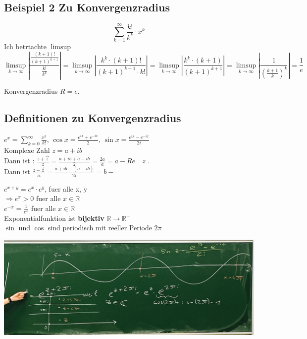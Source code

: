 \documentclass{article}
\theoremstyle{mytheoremstyle}
\theoremstyle{mytheoremstyle}
\theoremstyle{myproblemstyle}
\begin{document}
    \subsection{Beispiel 2 Zu Konvergenzradius}

    \[\sum_{k=1}^{\infty } \frac{k!}{k^k} \cdot x ^ {k}
    \]
    Ich betrtachte $\limsup $ 
    \[
        \limsup_{k \to \infty} \left| \frac{\frac{(k+1)!}{(k+1)^{k+1}}}{\frac{k!}{k^k}} \right|
        = \limsup_{k \to \infty} \left| \frac{k^k \cdot (k+1)!}{(k+1)^{k+1} \cdot k!} \right|
        = \limsup_{k \to \infty} \left| \frac{k^k \cdot (k+1)}{(k+1)^{k+1}} \right|
        = \limsup_{k \to \infty} \left| \frac{1}{\left(\frac{k+1}{k}\right)^k} \right|
        = \frac{1}{e}
    \]
    
    Konvergenzradius $R = e$. 

    \bigskip

    \subsection{Definitionen zu Konvergenzradius}

    $e^x = \sum_{k=0}^{\infty } \frac{x ^ {k}}{k!}$, $\cos x = \frac{e ^ {ix} + e ^ {-ix}}{2}$, $\sin x = \frac{e ^ {ix} - e ^ {-ix}}{2i}$  \\
    Komplexe Zahl $z = a + ib$ \\ 
    Dann ist : $ \frac{z + \vec{z}}{z} = \frac{a+ ib + a - ib }{2} = \frac{2a }{a} = a - Re \quad z$ . \\ 
    Dann ist $\frac{z - \vec{z }}{zi } = \frac{a + ib - (a - ib ) }{2i} = b - $ 

    \bigskip

    \begin{multicols}{2}
        $e ^ {x + y } = e ^ {x} \cdot  e ^ {y } $, fuer alle x, y \\ 
        $\Rightarrow  e ^ {x } > 0 $ fuer alle $ x \in \mathbb{R}$ \\ 
        $e ^ {-x } = \frac{1}{e ^ {x}}$  fuer alle $x \in \mathbb{R}$ \\
        Exponentialfunktion ist \textbf{bijektiv } $\mathbb{R} \rightarrow \mathbb{R ^ {+ }}$ \\ 
        $\sin $ und $\cos $ sind periodisch mit \color{red} reeller \color{black} Periode $2 \pi $ \\
    
        \columnbreak

        \includegraphics[width=.5\textwidth]{img:konversatorium202311210944.jpeg}
    \end{multicols}
\end{document}
